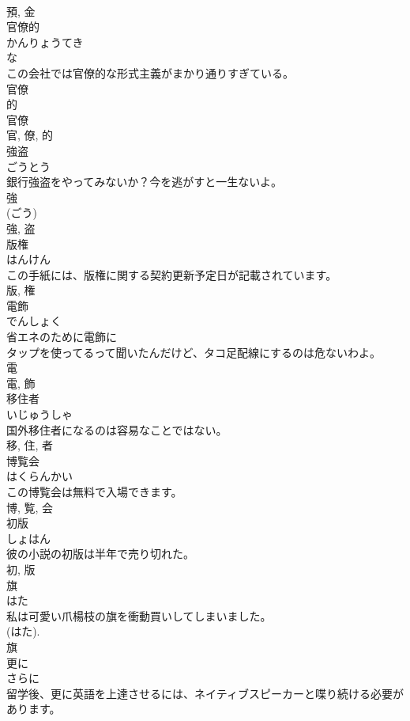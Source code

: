 \documentclass[8pt]{extreport}
\begin{document}
\begin{CJK}{UTF8}{min}
\\	預, 金	
\\	官僚的	
\\	かんりょうてき	
\\	な 
\\	この会社では官僚的な形式主義がまかり通りすぎている。	
\\	官僚 
\\	的 
\\	官僚 
\\	官, 僚, 的	
\\	強盗	
\\	ごうとう	
\\	銀行強盗をやってみないか？今を逃がすと一生ないよ。	
\\	強 
\\	(ごう) 
\\	強, 盗	
\\	版権	
\\	はんけん	
\\	この手紙には、版権に関する契約更新予定日が記載されています。	
\\	版, 権	
\\	電飾	
\\	でんしょく	
\\	省エネのために電飾に
\\	タップを使ってるって聞いたんだけど、タコ足配線にするのは危ないわよ。	
\\	電 
\\	電, 飾	
\\	移住者	
\\	いじゅうしゃ	
\\	国外移住者になるのは容易なことではない。	
\\	移, 住, 者	
\\	博覧会	
\\	はくらんかい	
\\	この博覧会は無料で入場できます。	
\\	博, 覧, 会	
\\	初版	
\\	しょはん	
\\	彼の小説の初版は半年で売り切れた。	
\\	初, 版	
\\	旗	
\\	はた	
\\	私は可愛い爪楊枝の旗を衝動買いしてしまいました。	
\\	(はた). 
\\	旗	
\\	更に	
\\	さらに	
\\	留学後、更に英語を上達させるには、ネイティブスピーカーと喋り続ける必要があります。	

\end{CJK}
\end{document}
